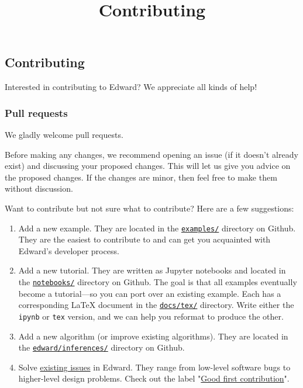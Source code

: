 \title{Contributing}

\subsection{Contributing}

Interested in contributing to Edward? We appreciate all kinds of help!

\subsubsection{Pull requests}

We gladly welcome pull requests.

Before making any changes, we recommend opening an issue (if it
doesn't already exist) and discussing your proposed changes. This will
let us give you advice on the proposed changes. If the changes are
minor, then feel free to make them without discussion.

Want to contribute but not sure what to contribute? Here are a few
suggestions:
\begin{enumerate}
\item
Add a new example.  They are located in the
\href{https://github.com/blei-lab/edward/tree/master/examples}
{\texttt{examples/}} directory on Github.
They are the easiest to contribute to and
can get you acquainted with Edward's developer process.
\item
Add a new tutorial. They are written as Jupyter notebooks and located
in the
\href{https://github.com/blei-lab/edward/tree/master/notebooks}
{\texttt{notebooks/}} directory on Github.
The goal is that all examples eventually become a tutorial---so you
can port over an existing example.
Each has a corresponding LaTeX document in the
\href{https://github.com/blei-lab/edward/tree/master/docs/tex}
{\texttt{docs/tex/}} directory.
Write either the \texttt{ipynb} or \texttt{tex} version, and we can
help you reformat to produce the other.
\item
Add a new algorithm (or improve existing algorithms).
They are located in the
\href{https://github.com/blei-lab/edward/tree/master/edward/inferences}
{\texttt{edward/inferences/}} directory on Github.
\item
Solve
\href{https://github.com/blei-lab/edward/issues}{existing issues}
in Edward. They range from low-level software bugs to higher-level
design problems. Check out the label
"\href{https://github.com/blei-lab/edward/issues?q=is%3Aissue+is%3Aopen+label%3A%22Good+first+contribution%22}
{Good first contribution}".
\end{enumerate}

